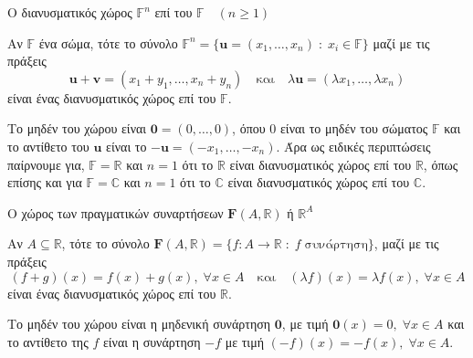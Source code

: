 \documentclass[a4paper,table]{report}
\begin{document}
\begin{example}\label{ex:Rn}
  \textcolor{Col2}{Ο διανυσματικός χώρος $ \mathbb{F}^{n} $ 
  επί του $ \mathbb{F} \quad (n \geq 1) $}

  Αν $ \mathbb{F} $ ένα σώμα, τότε το σύνολο $ \mathbb{F}^{n} = 
  \{ \mathbf{u} = (x_{1},\ldots,x_{n}) \; : \; x_{i} \in \mathbb{F}\} $ 
  μαζί με τις πράξεις 
  \[
    \mathbf{u}+ \mathbf{v} = (x_{1}+ y_{1}, \ldots , x_{n}+y_{n}) 
    \quad \text{και} \quad \lambda \mathbf{u} = 
    ( \lambda x_{1}, \ldots, \lambda x_{n})
  \]
  είναι ένας διανυσματικός χώρος επί του $ \mathbb{F} $. 

  Το μηδέν του χώρου 
  είναι $ \mathbf{0} = (0,\ldots,0) $, όπου $0$ είναι το μηδέν του σώματος 
  $ \mathbb{F} $ και το αντίθετο του $ \mathbf{u} $ είναι το $ - \mathbf{u} =
  (- x_{1}, \ldots, - x_{n}) $.
  Άρα ως ειδικές περιπτώσεις παίρνουμε για, $ \mathbb{F} = \mathbb{R} $ και $ n=1 $ 
  ότι το \textcolor{Col2}{$ \mathbb{R} $ είναι διανυσματικός χώρος επί του $ \mathbb{R}
  $}, όπως επίσης και για $ \mathbb{F} = \mathbb{C} $ και $ n=1 $ ότι το 
  \textcolor{Col2}{$ \mathbb{C} $ είναι διανυσματικός χώρος επί του 
  $ \mathbb{C} $}.
\end{example} 

\begin{example}\label{ex:funs} 
  \textcolor{Col2}{Ο χώρος των πραγματικών συναρτήσεων 
  $\mathbf{F}(A, \mathbb{R})$ ή $\mathbb{R} ^{A}$}

  Αν $ A \subseteq \mathbb{R} $, τότε το σύνολο 
  $ \mathbf{F}{(A, \mathbb{R})} = 
  \{ f \colon A \to \mathbb{R} \; : \; f \; \text{συνάρτηση} \} $, μαζί με 
  τις πράξεις
  \[
    (f+g)(x) = f(x) +g(x), \; \forall x \in A \quad \text{και} 
    \quad (\lambda f)(x)= \lambda f(x), \; \forall x \in A
  \] 
  είναι ένας διανυσματικός χώρος επί του $ \mathbb{R} $.

  Το μηδέν του χώρου είναι η μηδενική συνάρτηση $ \mathbf{0} $, με τιμή 
  $ \mathbf{0}(x)=0, \; \forall x \in A $ και το αντίθετο της $f$ είναι 
  η συνάρτηση $ -f $ με τιμή $ (-f)(x) = - f(x), \; \forall x \in A $.
\end{example}
\end{document}
